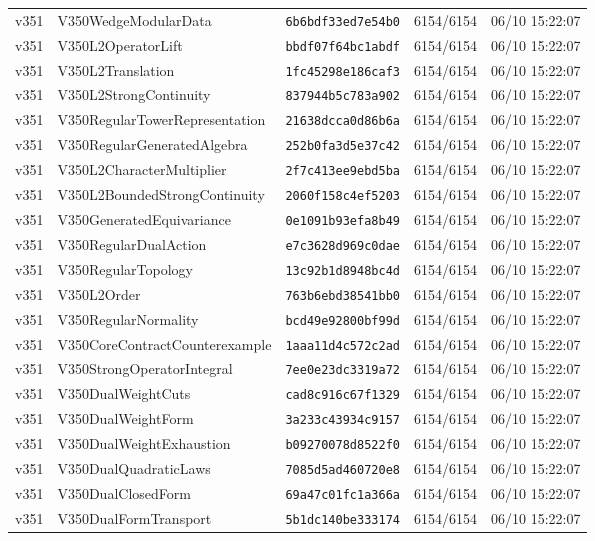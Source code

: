 \documentclass[11pt]{article}
\theoremstyle{definition}\newtheorem{deriv}{Derivation}
\begin{document}
{\begin{longtable}{@{}lllll@{}}
v351 & V350WedgeModularData & \texttt{6b6bdf33ed7e54b0} & 6154/6154 & 06/10 15:22:07 \\
v351 & V350L2OperatorLift & \texttt{bbdf07f64bc1abdf} & 6154/6154 & 06/10 15:22:07 \\
v351 & V350L2Translation & \texttt{1fc45298e186caf3} & 6154/6154 & 06/10 15:22:07 \\
v351 & V350L2StrongContinuity & \texttt{837944b5c783a902} & 6154/6154 & 06/10 15:22:07 \\
v351 & V350RegularTowerRepresentation & \texttt{21638dcca0d86b6a} & 6154/6154 & 06/10 15:22:07 \\
v351 & V350RegularGeneratedAlgebra & \texttt{252b0fa3d5e37c42} & 6154/6154 & 06/10 15:22:07 \\
v351 & V350L2CharacterMultiplier & \texttt{2f7c413ee9ebd5ba} & 6154/6154 & 06/10 15:22:07 \\
v351 & V350L2BoundedStrongContinuity & \texttt{2060f158c4ef5203} & 6154/6154 & 06/10 15:22:07 \\
v351 & V350GeneratedEquivariance & \texttt{0e1091b93efa8b49} & 6154/6154 & 06/10 15:22:07 \\
v351 & V350RegularDualAction & \texttt{e7c3628d969c0dae} & 6154/6154 & 06/10 15:22:07 \\
v351 & V350RegularTopology & \texttt{13c92b1d8948bc4d} & 6154/6154 & 06/10 15:22:07 \\
v351 & V350L2Order & \texttt{763b6ebd38541bb0} & 6154/6154 & 06/10 15:22:07 \\
v351 & V350RegularNormality & \texttt{bcd49e92800bf99d} & 6154/6154 & 06/10 15:22:07 \\
v351 & V350CoreContractCounterexample & \texttt{1aaa11d4c572c2ad} & 6154/6154 & 06/10 15:22:07 \\
v351 & V350StrongOperatorIntegral & \texttt{7ee0e23dc3319a72} & 6154/6154 & 06/10 15:22:07 \\
v351 & V350DualWeightCuts & \texttt{cad8c916c67f1329} & 6154/6154 & 06/10 15:22:07 \\
v351 & V350DualWeightForm & \texttt{3a233c43934c9157} & 6154/6154 & 06/10 15:22:07 \\
v351 & V350DualWeightExhaustion & \texttt{b09270078d8522f0} & 6154/6154 & 06/10 15:22:07 \\
v351 & V350DualQuadraticLaws & \texttt{7085d5ad460720e8} & 6154/6154 & 06/10 15:22:07 \\
v351 & V350DualClosedForm & \texttt{69a47c01fc1a366a} & 6154/6154 & 06/10 15:22:07 \\
v351 & V350DualFormTransport & \texttt{5b1dc140be333174} & 6154/6154 & 06/10 15:22:07 \\

\end{longtable}}
\end{document}
